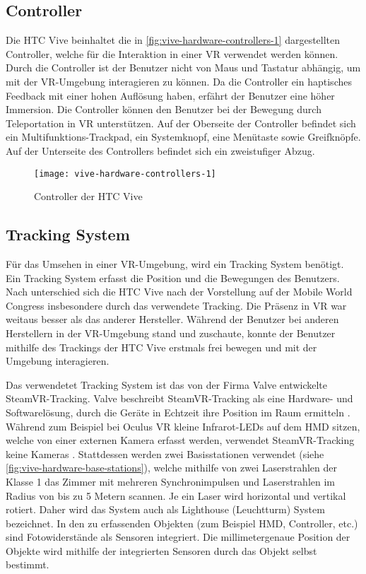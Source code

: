 \subsection{Controller}
Die HTC Vive beinhaltet die in \autoref{fig:vive-hardware-controllers-1} dargestellten Controller, welche für die Interaktion in einer \ac{VR} verwendet werden können. Durch die Controller ist der Benutzer nicht von Maus und Tastatur abhängig, um mit der \ac{VR}-Umgebung interagieren zu können. Da die Controller ein haptisches Feedback mit einer hohen Auflösung haben, erfährt der Benutzer eine höher Immersion. Die Controller können den Benutzer bei der Bewegung durch Teleportation in \ac{VR} unterstützen. Auf der Oberseite der Controller befindet sich ein Multifunktions-Trackpad, ein Systemknopf, eine Menütaste sowie Greifknöpfe. Auf der Unterseite des Controllers befindet sich ein zweistufiger Abzug. \cite{ViveProduct}

\begin{figure}[!htbp]
	\centering
	\texttt{[image: vive-hardware-controllers-1]}
	\caption[Controller der HTC Vive]{Controller der HTC Vive \cite{ViveControllers}}
	\label{fig:vive-hardware-controllers-1}
\end{figure}

\subsection{Tracking System}
Für das Umsehen in einer \ac{VR}-Umgebung, wird ein Tracking System benötigt. Ein Tracking System erfasst die Position und die Bewegungen des Benutzers. Nach \citeauthor{Sauter.2015} unterschied sich die HTC Vive nach der Vorstellung auf der Mobile World Congress insbesondere durch das verwendete Tracking. Die Präsenz in \ac{VR} war weitaus besser als das anderer Hersteller. Während der Benutzer bei anderen Herstellern in der \ac{VR}-Umgebung stand und zuschaute, konnte der Benutzer mithilfe des Trackings der HTC Vive erstmals frei bewegen und mit der Umgebung interagieren. \cite{Sauter.2015} 

Das verwendetet Tracking System ist das von der Firma Valve entwickelte SteamVR-Tracking. Valve beschreibt SteamVR-Tracking als eine Hardware- und Softwarelösung, durch die Geräte in Echtzeit ihre Position im Raum ermitteln \cite{Valve.2020}. Während zum Beispiel bei Oculus VR kleine Infrarot-LEDs auf dem \ac{HMD} sitzen, welche von einer externen Kamera erfasst werden, verwendet SteamVR-Tracking keine Kameras \cite{Sauter.2015}. Stattdessen werden zwei Basisstationen verwendet (siehe \autoref{fig:vive-hardware-base-stations}), welche mithilfe von zwei Laserstrahlen der Klasse 1 \glqq das Zimmer mit mehreren Synchronimpulsen und Laserstrahlen im Radius von bis zu 5 Metern\grqq \cite{Valve.2020} scannen. Je ein Laser wird horizontal und vertikal rotiert. Daher wird das System auch als Lighthouse (Leuchtturm) System bezeichnet. In den zu erfassenden Objekten (zum Beispiel \ac{HMD}, Controller, etc.) sind Fotowiderstände als Sensoren integriert. Die millimetergenaue Position der Objekte wird mithilfe der integrierten Sensoren durch das Objekt selbst bestimmt. \cite{Yates.20160512}

